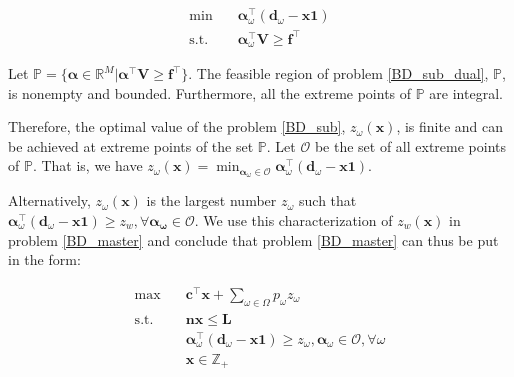 \begin{equation}\label{BD_sub_dual}
  \begin{aligned}
    \min \quad & \bm{\alpha}_{\omega}^{\intercal} (\mathbf{d}_{\omega}- \mathbf{x} \mathbf{1}) \\
    \text {s.t.} \quad & \bm{\alpha}_{\omega}^{\intercal} \mathbf{V} \geq \mathbf{f}^{\intercal}
  \end{aligned}
\end{equation}

\begin{lem}\label{feasible_region}
Let $\mathbb{P} = \{\bm{\alpha} \in \mathbb{R}^{M}|\bm{\alpha}^{\intercal} \mathbf{V} \geq \mathbf{f}^{\intercal}\}$. The feasible region of problem \eqref{BD_sub_dual}, $\mathbb{P}$, is nonempty and bounded. Furthermore, all the extreme points of $\mathbb{P}$ are integral.
\end{lem}

Therefore, the optimal value of the problem \eqref{BD_sub}, $z_{\omega}(\mathbf{x})$, is finite and can be achieved at extreme points of the set $\mathbb{P}$. Let $\mathcal{O}$ be the set of all extreme points of $\mathbb{P}$. That is, we have $z_{\omega}(\mathbf{x}) = \min_{\bm{\alpha}_{\omega} \in \mathcal{O}} \bm{\alpha}_{\omega}^{\intercal}(\mathbf{d}_{\omega}- \mathbf{x} \mathbf{1})$.



Alternatively, $z_{\omega}(\mathbf{x})$ is the largest number $z_{\omega}$ such that $\bm{\alpha}_{\omega}^{\intercal}(\mathbf{d}_{\omega}- \mathbf{x} \mathbf{1}) \geq z_w, \forall \bm{\alpha_{\omega}} \in \mathcal{O}$. We use this characterization of $z_w(\mathbf{x})$ in problem \eqref{BD_master} and conclude that problem \eqref{BD_master} can thus be put in the form:

\begin{equation}\label{BD_master2}
  \begin{aligned}
    \max \quad & \mathbf{c}^{\intercal} \mathbf{x} + \sum_{\omega \in \Omega} p_{\omega} z_{\omega} \\
    \text {s.t.} \quad & \mathbf{n} \mathbf{x} \leq \mathbf{L} \\
    & \bm{\alpha}_{\omega}^{\intercal}(\mathbf{d}_{\omega}- \mathbf{x} \mathbf{1}) \geq z_{\omega}, \bm{\alpha}_{\omega} \in \mathcal{O}, \forall \omega \\
     & \mathbf{x} \in \mathbb{Z}_{+}
  \end{aligned}
\end{equation}

